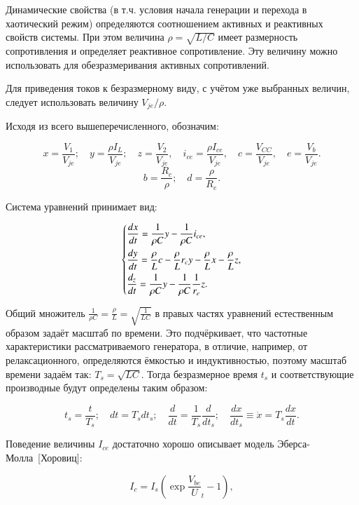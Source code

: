 \documentclass[a4paper,12pt]{article}
\begin{document}
Динамические свойства (в т.ч. условия начала генерации и перехода в хаотический режим) определяются
соотношением активных и реактивных свойств системы. При этом величина
$ \rho = \sqrt{L/C} $ имеет размерность сопротивления
и определяет реактивное сопротивление. Эту величину можно использовать
для обезразмеривания активных сопротивлений.

Для приведения токов к безразмерному виду, с учётом уже выбранных величин,
следует использовать величину $ V_{je} / \rho$.


Исходя из всего вышеперечисленного, обозначим:

\[
  x = \frac{V_{1}}{V_{je}} ; \quad
  y = \frac{\rho I_L}{V_{je}} ; \quad
  z = \frac{V_{2}}{V_{je}}, \quad
  i_{ce} = \frac{\rho I_{ce}}{V_{je}}, \quad
  c = \frac{V_{CC}}{V_{je}}, \quad
  e = \frac{V_{b}}{V_{je}}.
\]
\[
  b = \frac{R_c}{\rho}; \quad
  d = \frac{\rho}{R_e}. %
\]

Система уравнений принимает вид:


\begin{equation}
\label{atu:eq:colp_phys2}
\begin{dcases}
  \dfrac{d x}{dt}  = \dfrac{1}{\rho C}  y - \dfrac{1}{\rho C} i_{ce} , \\
  \dfrac{d y}{dt}  = \dfrac{\rho}{L} c    - \dfrac{\rho}{L} r_c y - \dfrac{\rho}{L} x- \dfrac{\rho}{L} z, \\
  \dfrac{d_z}{dt}  = \dfrac{1}{\rho C}  y - \dfrac{1}{\rho C} \dfrac{1}{r_e} z.
\end{dcases}
\end{equation}

Общий множитель $ \frac{1}{\rho C} = \frac{\rho}{L} = \sqrt{\frac{1}{LC}} $ в правых частях уравнений
естественным образом задаёт масштаб по времени.
Это подчёркивает, что частотные характеристики рассматриваемого генератора,
в отличие, например, от релаксационного,
определяются ёмкостью и индуктивностью,
поэтому масштаб времени задаём так:
$ T_s = \sqrt{L C} $.
Тогда безразмерное время $t_s$
и соответствующие производные
будут определены таким образом:

\[
  t_s = \frac{t}{T_s}; \quad
  dt = T_s dt_s; \quad
  \frac{d}{dt} = \frac{1}{T_s} \frac{d}{dt_s}; \quad
  \frac{dx}{dt_s} \equiv \dot{x} = T_s \frac{dx}{dt} .
\]

Поведение величины $I_{ce}$ достаточно хорошо описывает модель
Эберса-Молла~[Хоровиц]:

\begin{equation}
  I_c = I_s \left( \exp\frac{V_{be}}U_t{} - 1 \right),
  \label{atu:eq:ebers-moll}
\end{equation}
\end{document}
